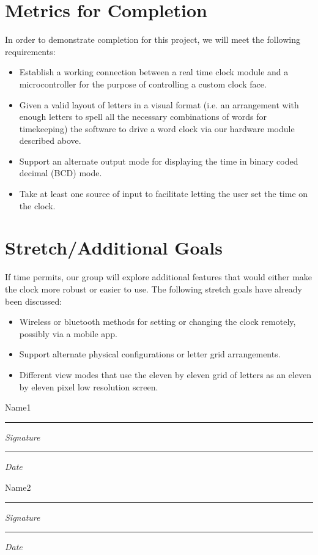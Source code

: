 \documentclass[10pt,draftclsnofoot,onecolumn]{IEEEtran}
\newcommand{\namesigdate}[2][5cm]{%
\begin{minipage}{#1}
    #2 \vspace{1.0cm}\hrule\smallskip
    \small \textit{Signature}
    \vspace{1.0cm}\hrule\smallskip
    \small \textit{Date}
\end{minipage}
}
\begin{document}
\section{Metrics for Completion}
In order to demonstrate completion for this project, we will meet the following requirements:
\begin{itemize}
  \item Establish a working connection between a real time clock module and a
  microcontroller for the purpose of controlling a custom clock face.
  \item Given a valid layout of letters in a visual format (i.e. an arrangement
  with enough letters to spell all the necessary combinations of words for
  timekeeping) the software to drive a word clock via our hardware module
  described above.
  \item Support an alternate output mode for displaying the time in binary coded
  decimal (BCD) mode.
  \item Take at least one source of input to facilitate letting the user set the
  time on the clock.
\end{itemize}

\section{Stretch/Additional Goals}
If time permits, our group will explore additional features that would either
make the clock more robust or easier to use. The following stretch goals have
already been discussed:
\begin{itemize}
  \item Wireless or bluetooth methods for setting or changing the clock remotely,
  possibly via a mobile app.
  \item Support alternate physical configurations or letter grid arrangements.
  \item Different view modes that use the eleven by eleven grid of letters as an
  eleven by eleven pixel low resolution screen.
\end{itemize}

\newpage
\newpage

\noindent \namesigdate{Name1} \hfill \namesigdate[3cm]{Name2}
\end{document}
